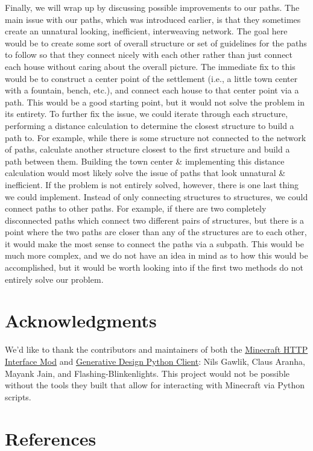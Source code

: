\documentclass[11pt, oneside]{article}
\begin{document}
\begin{normalsize}
Finally, we will wrap up by discussing possible improvements to our paths. 
The main issue with our paths, which was introduced earlier, is that they sometimes create an unnatural looking, inefficient, interweaving network. 
The goal here would be to create some sort of overall structure or set of guidelines for the paths to follow so that they connect nicely with each other rather than just connect each house without caring about the overall picture. 
The immediate fix to this would be to construct a center point of the settlement (i.e., a little town center with a fountain, bench, etc.), and connect each house to that center point via a path. 
This would be a good starting point, but it would not solve the problem in its entirety. 
To further fix the issue, we could iterate through each structure, performing a distance calculation to determine the closest structure to build a path to. 
For example, while there is some structure not connected to the network of paths, calculate another structure closest to the first structure and build a path between them. 
Building the town center \& implementing this distance calculation would most likely solve the issue of paths that look unnatural \& inefficient. 
If the problem is not entirely solved, however, there is one last thing we could implement. 
Instead of only connecting structures to structures, we could connect paths to other paths. 
For example, if there are two completely disconnected paths which connect two different pairs of structures, but there is a point where the two paths are closer than any of the structures are to each other, it would make the most sense to connect the paths via a subpath. 
This would be much more complex, and we do not have an idea in mind as to how this would be accomplished, but it would be worth looking into if the first two methods do not entirely solve our problem. 

\section{Acknowledgments}
\label{Acknowledgments}

We'd like to thank the contributors and maintainers of both the \href{https://github.com/nilsgawlik/gdmc_http_interface}{Minecraft HTTP Interface Mod} and \href{https://github.com/nilsgawlik/gdmc_http_client_python}{Generative Design Python Client}: Nils Gawlik, Claus Aranha, Mayank Jain, and Flashing-Blinkenlights. This project would not be possible without the tools they built that allow for interacting with Minecraft via Python scripts.

\newpage

\section{References}
\label{references}
\nocite{*}
\printbibliography[heading=none]

\end{normalsize}
\end{document}
